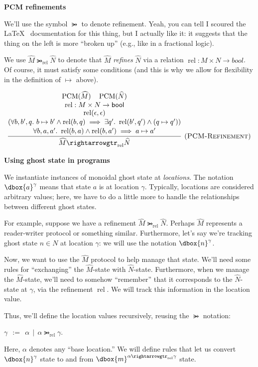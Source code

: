 \documentclass{article}
\newcommand{\einfer}[3]
        {\infer[(\textsc{#1})]{#3}{#2}}
\newcommand{\stacktwo}[2]{\stackanchor{\ensuremath{#1}}{\ensuremath{#2}}}
\newcommand{\stackthree}[3]{\stackanchor{\stacktwo{#1}{#2}}{\ensuremath{#3}}}
\newcommand{\stackfour}[4]{\stackanchor{\stackthree{#1}{#2}{#3}}{\ensuremath{#4}}}
\newcommand{\stackfive}[5]{\stackanchor{\stackfour{#1}{#2}{#3}{#4}}{\ensuremath{#5}}}
\newcommand\dboxed[1]{\dbox{\vphantom{t}\ensuremath{#1}}}
\newcommand{\unit}{\epsilon}
\newcommand{\bool}{\textsf{bool}}
\DeclareMathOperator{\rel}{rel}
\DeclareMathOperator{\PCM}{PCM}
\newcommand{\refines}{\rightarrowgtr}
\begin{document}
\textbf{PCM refinements}

We'll use the symbol $\refines$ to denote refinement. Yeah, you can tell I scoured the \LaTeX~ documentation for this thing, but I actually like it: it suggests that the thing on the left is more ``broken up'' (e.g., like in a fractional logic).

We use $\widehat{M} \refines_{\rel} \widehat{N}$ to denote that $\widehat{M}$ \emph{refines} $\widehat{N}$ via a relation $\rel : M \times N \to bool$. Of course, it must satisfy some conditions 
(and this is why we allow for flexibility in the definition of $\mapsto$ above).

\[
  \einfer{PCM-Refinement}{
    \stackfive{
      \PCM(\widehat{M}) \quad \PCM(\widehat{N})
    }{
      \rel : M \times N \to \bool
    }{
      \rel(\unit, \unit)
    }{
       (\forall b, b', q .~ b \mapsto b' \land \rel(b, q) \implies \exists q' .~ \rel(b', q') \land (q \mapsto q'))
    }{
      \forall b, a, a' .~ \rel(b,a) \land \rel(b,a') \implies a \mapsto a'
    }
  }{
    \widehat{M} \refines_{\rel} \widehat{N}
  }
\]

\textbf{Using ghost state in programs}

We instantiate instances of monoidal ghost state at \emph{locations}.
The notation $\dboxed{a}^\gamma$ means that state $a$ is at location $\gamma$.
Typically, locations are considered arbitrary values; here, we have to do a little
more to handle the relationships between different ghost states.

For example, suppose we have a refinement $\widehat{M} \refines_{\rel} \widehat{N}$.
Perhaps $\widehat{M}$ represents a reader-writer protocol or something similar.
Furthermore, let's say we're tracking ghost state $n \in N$ at location $\gamma$:
we will use the notation $\dboxed{n}^\gamma$.

Now, we want to use the $\widehat{M}$ protocol to help manage that state.
We'll need some rules for ``exchanging'' the $\widehat{M}$-state with $\widehat{N}$-state.
Furthermore, when we manage the $\widehat{M}$-state, we'll need to somehow ``remember''
that it corresponds to the $\widehat{N}$-state at $\gamma$, via the refinement $\rel$.
We will track this information in the location value.

Thus, we'll define the location values recursively, reusing the $\refines$ notation:

$\gamma ~~:=~~ \alpha ~~|~~ \alpha \refines_{\rel} \gamma$.

Here, $\alpha$ denotes any ``base location.'' We will define rules that let us
convert $\dboxed{n}^\gamma$ state to and from $\dboxed{m}^{\alpha \refines_{\rel} \gamma}$
state.
\end{document}
